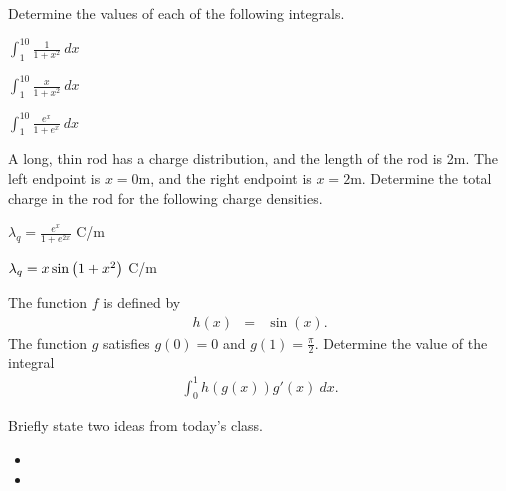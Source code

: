 
\begin{problem}
\item Determine the values of each of the following integrals.
  \begin{subproblem}
  \item $\int^{10}_1 \frac{1}{1+x^2} ~ dx$
    \vfill
  \item $\int^{10}_1 \frac{x}{1+x^2} ~ dx$
    \vfill
  \item $\int^{10}_1 \frac{e^x}{1+e^{x}} ~ dx$
    \vfill
  \end{subproblem}
\end{problem}


\begin{problem}
\item A long, thin rod has a charge distribution, and the length of the rod is
  2m. The left endpoint is $x=0$m, and the right endpoint is
  $x=2$m. Determine the total charge in the rod for the following
  charge densities.
  \begin{subproblem}
    \item $\lambda_q = \frac{e^x}{1+e^{2x}}$ C/m
      \vfill
    \item $\lambda_q = x\sin\left( 1+x^2\right)$ C/m
      \vfill
  \end{subproblem}
  \clearpage
  \item The function $f$ is defined by
  \begin{eqnarray*}
    h(x) & = & \sin(x).
  \end{eqnarray*}
  The function $g$ satisfies $g(0)=0$ and $g(1)=\frac{\pi}{2}$.
  Determine the value of the integral
  \begin{eqnarray*}
    \int^1_0 h(g(x)) g'(x) ~ dx.
  \end{eqnarray*}
  \vfill
\end{problem}


\postClass

\begin{problem}
\item Briefly state two ideas from today's class.
  \begin{itemize}
  \item
  \item
  \end{itemize}
\item
  \begin{subproblem}
    \item
  \end{subproblem}
\end{problem}


